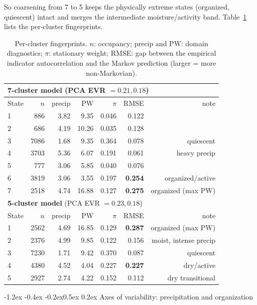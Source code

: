 \documentclass[10pt]{article}
\makeatletter
\renewcommand\section{\@startsection{section}{1}{\z@}%
  {-1.2ex \@plus -0.4ex \@minus -0.2ex}{0.5ex \@plus 0.2ex}%
  {\normalfont\large\bfseries}}
\makeatother
\begin{document}
So coarsening from 7 to 5 keeps the physically extreme states (organized,
quiescent) intact and merges the intermediate moisture/activity band. Table~\ref{tab:fp}
lists the per-cluster fingerprints.

\begin{table}[htbp]
\centering
\caption{Per-cluster fingerprints. $n$: occupancy; precip and PW: domain
diagnostics; $\pi$: stationary weight; RMSE: gap between the empirical indicator
autocorrelation and the Markov prediction (larger = more non-Markovian).}
\label{tab:fp}
\small
\begin{tabular}{l r r r r r r}
\toprule
\multicolumn{7}{l}{\textbf{7-cluster model} \quad (PCA EVR $=0.21,0.18$)}\\
\midrule
State & $n$ & precip & PW & $\pi$ & RMSE & note\\
\midrule
1 & 886  & 3.82 & 9.35  & 0.046 & 0.122 & \\
2 & 686  & 4.19 & 10.26 & 0.035 & 0.128 & \\
3 & 7086 & 1.68 & 9.35  & 0.364 & 0.078 & quiescent\\
4 & 3703 & 5.36 & 6.07  & 0.191 & 0.061 & heavy precip\\
5 & 777  & 3.06 & 5.85  & 0.040 & 0.076 & \\
6 & 3819 & 3.06 & 3.55  & 0.197 & \textbf{0.254} & organized/active\\
7 & 2518 & 4.74 & 16.88 & 0.127 & \textbf{0.275} & organized (max PW)\\
\midrule
\multicolumn{7}{l}{\textbf{5-cluster model} \quad (PCA EVR $=0.23,0.18$)}\\
\midrule
State & $n$ & precip & PW & $\pi$ & RMSE & note\\
\midrule
1 & 2562 & 4.69 & 16.85 & 0.129 & \textbf{0.287} & organized (max PW)\\
2 & 2376 & 4.99 & 9.85  & 0.122 & 0.156 & moist, intense precip\\
3 & 7230 & 1.71 & 9.42  & 0.370 & 0.087 & quiescent\\
4 & 4380 & 4.52 & 4.04  & 0.227 & \textbf{0.227} & dry/active\\
5 & 2927 & 2.74 & 4.22  & 0.152 & 0.112 & dry transitional\\
\bottomrule
\end{tabular}
\end{table}

\section{Axes of variability: precipitation and organization}
\end{document}
